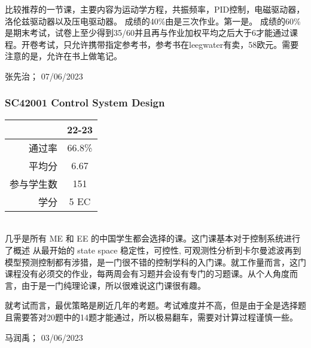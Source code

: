 比较推荐的一节课，主要内容为运动学方程，共振频率，PID控制，电磁驱动器，洛伦兹驱动器以及压电驱动器。
成绩的40\%由是三次作业。第一是。
成绩的60\%是期末考试，试卷上至少得到35/60并且再与作业加权平均之后大于6才能通过课程。开卷考试，只允许携带指定参考书，参考书在leegwater有卖，58欧元。需要注意的是，允许在书上做笔记。

\begin{flushright}
张先治； 07/06/2023
\end{flushright}

\subsubsection{SC42001 Control System Design}
\begin{minipage}{0.45\textwidth}
\centering
{}
\end{minipage}%
\begin{minipage}{0.45\textwidth}
\raggedleft
\begin{tabular}{r|c}
\textbf{ } & \textbf{22-23} \\ \hline
通过率 & 66.8\% \\ 
平均分 & 6.67 \\ 
参与学生数 & 151 \\ 
学分 & 5 EC\\
\end{tabular}
\end{minipage}\\

几乎是所有 ME 和 EE 的中国学生都会选择的课。这门课基本对于控制系统进行了概述 从最开始的 state space 稳定性，可控性, 可观测性分析到卡尔曼滤波再到模型预测控制都有涉猎，是一门很不错的控制学科的入门课。就工作量而言，这门课程没有必须交的作业，每两周会有习题并会设有专门的习题课。从个人角度而言，由于是一门纯理论课，所以很难说这门课很有趣。

就考试而言，最优策略是刷近几年的考题。考试难度并不高，但是由于全是选择题且需要答对20题中的14题才能通过，所以极易翻车，需要对计算过程谨慎一些。
\begin{flushright}
马润禹； 03/06/2023
\end{flushright}


